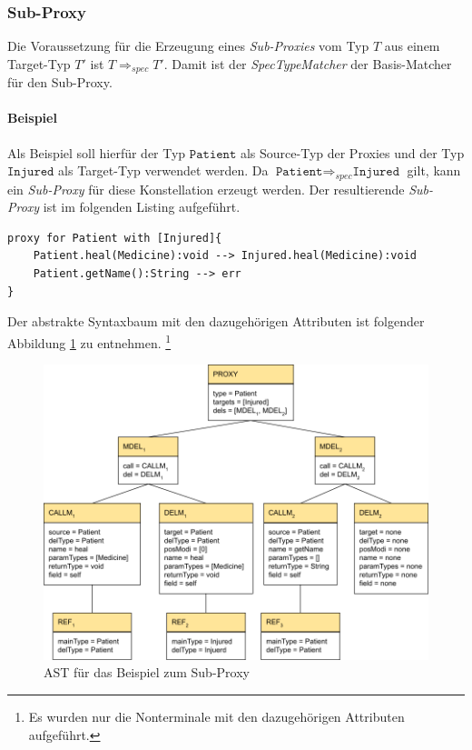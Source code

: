 \documentclass[a4paper,12pt]{article}
\begin{document}
\subsubsection{Sub-Proxy}
Die Voraussetzung für die Erzeugung eines \emph{Sub-Proxies} vom Typ $T$ aus einem Target-Typ $T'$ ist $T \Rightarrow_{spec} T'$. Damit ist der \emph{SpecTypeMatcher} der Basis-Matcher für den Sub-Proxy.\paragraph{Beispiel}
Als Beispiel soll hierfür der Typ $\texttt{Patient}$ als Source-Typ der Proxies und der Typ $\texttt{Injured}$ als Target-Typ verwendet werden. Da $\texttt{Patient} \Rightarrow_{spec} \texttt{Injured}$ gilt, kann ein \emph{Sub-Proxy} für diese Konstellation erzeugt werden. Der resultierende \emph{Sub-Proxy} ist im folgenden Listing aufgeführt.
\begin{lstlisting}[style = dsl]
proxy for Patient with [Injured]{
	Patient.heal(Medicine):void --> Injured.heal(Medicine):void
	Patient.getName():String --> err
}
\end{lstlisting}
Der abstrakte Syntaxbaum mit den dazugehörigen Attributen ist folgender Abbildung \ref{fig:ASTSUB} zu entnehmen. \footnote{Es wurden nur die Nonterminale mit den dazugehörigen Attributen aufgeführt.}
\begin{figure}[h!]
\includegraphics[width=\linewidth]{AST_SubExample}
\caption{AST für das Beispiel zum Sub-Proxy}
\label{fig:ASTSUB}
\end{figure}
\noindent
\end{document}
